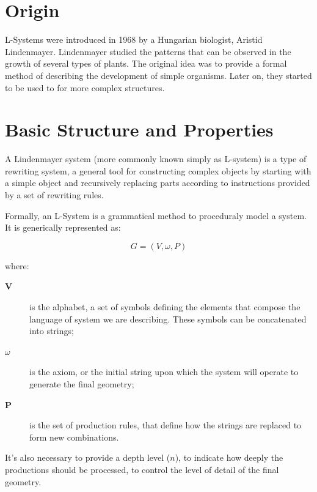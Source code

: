 \documentclass{acmtog}
\begin{document}
\section{Origin}
\label{sec:origin}

L-Systems were introduced in 1968 by a Hungarian biologist, Aristid Lindenmayer. Lindenmayer studied the patterns that can be observed in the growth of several types of plants. The original idea was to provide a formal method of describing the development of simple organisms. Later on, they started to be used to for more complex structures.




\section{Basic Structure and Properties}
\label{sec:basicstruct}

A Lindenmayer system (more commonly known simply as L-system) is a type of rewriting system, a general tool for constructing complex objects by starting with a simple object and recursively replacing parts according to instructions provided by a set of rewriting rules.

Formally, an L-System is a grammatical method to proceduraly model a system. It is generically represented as:

\begin{equation}
  G = (V, \omega , P)
  \label{eq:genericsystem}
\end{equation}

where:
\begin{description}
  \item[\textbf{V}] is the alphabet, a set of symbols defining the elements that compose the language of system we are describing. These symbols can be concatenated into strings;
  \item[\textbf{$\omega$}] is the axiom, or the initial string upon which the system will operate to generate the final geometry;
  \item[\textbf{P}] is the set of production rules, that define how the strings are replaced to form new combinations.
\end{description}

It's also necessary to provide a depth level ($n$), to indicate how deeply the productions should be processed, to control the level of detail of the final geometry.
\end{document}
